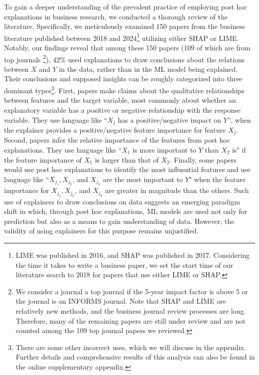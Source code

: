 \documentclass[mnsc,blindrev]{informs3}
\begin{document}
To gain a deeper understanding of the prevalent practice of employing post hoc explanations in business research, we conducted a thorough review of the literature. Specifically, we meticulously examined 150 papers from the business literature published between 2018 and 2024\footnote{LIME was published in 2016, and SHAP was published in 2017. Considering the time it takes to write a business paper, we set the start time of our literature search to 2018 for papers that use either LIME or SHAP.} utilizing either SHAP or LIME. Notably, our findings reveal that among these 150 papers (109 of which are from top journals \footnote{We consider a journal a top journal if the 5-year impact factor is above 5 or the journal is an INFORMS journal. Note that SHAP and LIME are relatively new methods, and the business journal review processes are long. Therefore, many of the remaining papers are still under review and are not counted among the 109 top journal papers we reviewed.}), 42\% used explanations to draw conclusions about the relations between $X$ and $Y$ in the data, rather than in the ML model being explained. Their conclusions and supposed insights can be roughly categorized into three dominant types\footnote{There are some other incorrect uses, which we will discuss in the appendix. Further details and comprehensive results of this analysis can also be found in the online supplementary  appendix.}. First, papers make claims about the qualitative relationships between features and the target variable, most commonly about whether an explanatory variable has a positive or negative relationship with the response variable. They use language like ``$X_j$ has a positive/negative impact on $Y$'', when the explainer provides a positive/negative feature importance for feature $X_j$. Second, papers infer the relative importance of the features from post hoc explanations. They use language like ``$X_1$ is more important to $Y$ than $X_2$ is" if the feature importance of $X_1$ is larger than that of $X_2$. Finally, some papers would use post hoc explanations to identify the most influential features and use language like ``$X_{j_1}, X_{j_2}$, and $X_{j_3}$ are the most important to $Y$" when the feature importance for $X_{j_1}, X_{j_2}$, and $X_{j_3}$ are greater in magnitude than the others. 
Such use of explainers to draw conclusions on data suggests an emerging paradigm shift in which, through post hoc explanations, ML models are used not only for prediction but also as a means to gain understanding of data. However, the validity of using explainers for this purpose remains unjustified. 
\end{document}
